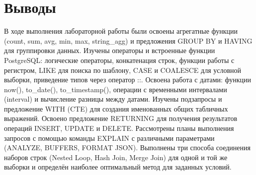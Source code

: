 \documentclass[oneside,a4paper,14pt]{extarticle}
\begin{document}
	\newpage
	
	\section*{Выводы} В ходе выполнения лабораторной работы были освоены агрегатные функции (count, sum, avg, min, max, string\_agg) и предложения GROUP BY и HAVING для группировки данных. Изучены операторы и встроенные функции PostgreSQL: логические операторы, конкатенация строк, функции работы с регистром, LIKE для поиска по шаблону, CASE и COALESCE для условной выборки, приведение типов через оператор ::. Освоена работа с датами: функции now(), to\_date(), to\_timestamp(), операции с временными интервалами (interval) и вычисление разницы между датами. Изучены подзапросы и предложение WITH (CTE) для создания именованных общих табличных выражений. Освоено предложение RETURNING для получения результатов операций INSERT, UPDATE и DELETE. Рассмотрены планы выполнения запросов с помощью команды EXPLAIN с различными параметрами (ANALYZE, BUFFERS, FORMAT JSON). Выполнены три способа соединения наборов строк (Nested Loop, Hash Join, Merge Join) для одной и той же выборки и определён наиболее оптимальный метод для заданных условий.
	
\end{document}

